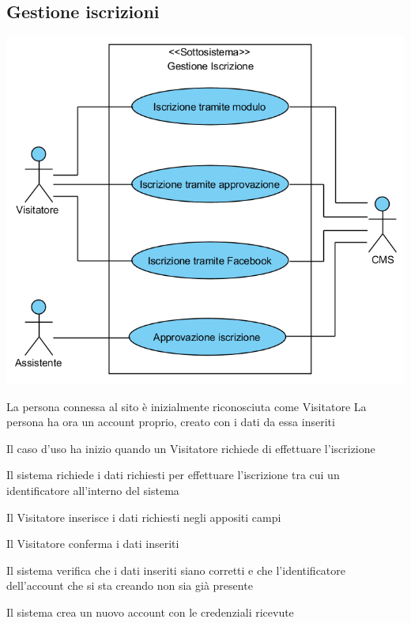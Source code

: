 \subsection{Gestione iscrizioni}
\begin{center}
   \includegraphics[width=\textwidth]{assets/visualParadigm/cu/GestioneIscrizione}
\end{center}
{}
{La persona connessa al sito è inizialmente riconosciuta come Visitatore}
{La persona ha ora un account proprio, creato con i dati da essa inseriti}
{\begin{enumCU}
	\item Il caso d'uso ha inizio quando un Visitatore richiede di effettuare l'iscrizione
	\item Il sistema richiede i dati richiesti per effettuare l'iscrizione tra cui un identificatore all'interno del sistema
	\item Il Visitatore inserisce i dati richiesti negli appositi campi \label{cuiscr:3}
	\item Il Visitatore conferma i dati inseriti
	\item Il sistema verifica che i dati inseriti siano corretti e che l'identificatore dell'account che si sta creando non sia già presente \label{cuiscr:5}
	\item Il sistema crea un nuovo account con le credenziali ricevute
\end{enumCU}}
